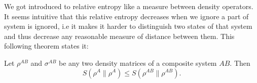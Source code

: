 We got introduced to relative entropy like a measure between density operators. It seems intuitive that this relative entropy decreases when we ignore a part of system is ignored, i.e it makes it harder to distinguish two states of that system and thus decrease any reasonable measure of distance between them. This following theorem states it:
\begin{theorem}
    Let $\rho^{AB}$ and $\sigma^{AB}$ be any two density matrices of a composite system $AB$. Then
    \begin{equation}
        S(\rho^A \parallel \rho^A) \leq S(\rho^{AB} \parallel \rho^{AB}).
    \end{equation}
\end{theorem}